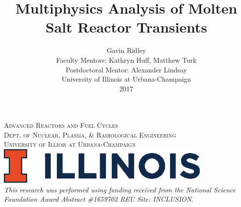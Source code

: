 \begin{titlepage}
    \textsc{\LARGE Advanced Reactors and Fuel Cycles}\\[0.25cm] %
    
    \textsc{\large Dept. of Nuclear, Plasma, \& Radiological Engineering}\\%
    
    \textsc{\large University of Illiois at Urbana-Champaign}\\ %


    
    
    \vspace{0.5cm}
    \includegraphics[width=0.8\textwidth]{illinois}\\[1cm] %
     

    \textit{This research was performed using funding received from the 
    National Science Foundation Award Abstract \#1659702 REU Site: INCLUSION.}
\end{titlepage}





\title{Multiphysics Analysis of Molten Salt Reactor Transients}
\author{Gavin Ridley\\
        Faculty Mentors: Kathryn Huff, Matthew Turk \\
        Postdoctoral Mentor: Alexander Lindsay \\
        University of Illinois at Urbana-Champaign \\
        2017 \\}
\maketitle

